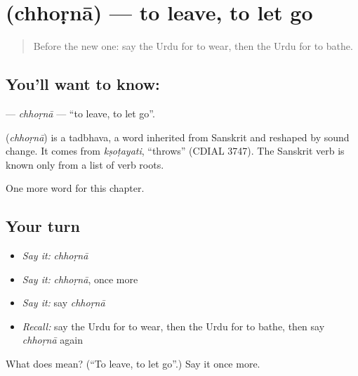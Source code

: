 \section[\texorpdfstring{\ur{چھوڑنا} (chhoṛnā)}{چھوڑنا (chhoṛnā)}]{ (chhoṛnā) — to leave, to let go}

\label{lesson:UR-C53-chhorna}



\begin{quote}
Before the new one: say the Urdu for to wear, then the Urdu for to bathe.
\end{quote}

\subsection*{You'll want to know: }
\textbf{} — \emph{chhoṛnā} — \textquotedblleft{}to leave, to let go\textquotedblright{}.

\begin{cousinweb}
\textbf{} (\emph{chhoṛnā}) is a tadbhava, a word inherited from Sanskrit and reshaped by sound change. It comes from \emph{kṣoṭayati}, \textquotedblleft{}throws\textquotedblright{} (CDIAL 3747). The Sanskrit verb is known only from a list of verb roots.
\end{cousinweb}

\begin{grammarlens}[title={What you've built}]
One more word for this chapter.
\end{grammarlens}

\subsection*{Your turn}
\begin{itemize}
\raggedright
  \item \emph{Say it:} \emph{chhoṛnā}
  \item \emph{Say it:} \emph{chhoṛnā}, once more
  \item \emph{Say it:} say \emph{chhoṛnā}
  \item \emph{Recall:} say the Urdu for to wear, then the Urdu for to bathe, then say \emph{chhoṛnā} again
\end{itemize}

\begin{tcolorbox}[breakable,colback=teal!4,colframe=teal!35!black,title={Before you move on}]
What does  mean? (\textquotedblleft{}To leave, to let go\textquotedblright{}.) Say it once more.
\end{tcolorbox}
